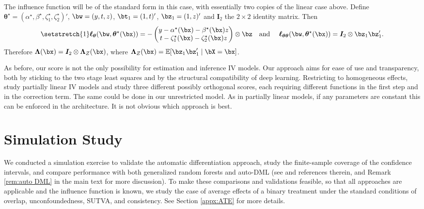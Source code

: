 \documentclass[12pt]{article}
\numberwithin{equation}{section}
\theoremstyle{definition}
\newcommand{\E}{\mathbb{E}}
\newcommand{\btheta}{\boldsymbol{\theta}}
\newcommand{\bL}{\boldsymbol{\Lambda}}
\newcommand{\bttrue}{\btheta^\star}
\newcommand{\atrue}{\alpha^\star}
\newcommand{\btrue}{\beta^\star}
\newcommand{\ztrue}{\zeta^\star}
\begin{document}
\begin{appendices}
The influence function will be of the standard form in this case, with essentially two copies of the linear case above. Define $\bttrue = (\atrue, \btrue, \ztrue_1, \ztrue_2)'$, $\bw = (y,t,z)$, $\bt_1 = (1,t)'$, $\bz_1 = (1,z)'$ and $\bm{I}_2$ the $2\times2$ identity matrix. Then
\begin{equation*}
    \setstretch{1}
    \bm{\ell}_{\btheta}(\bw, \bttrue(\bx)) = 
        - \begin{pmatrix}
            y - \atrue(\bx) - \btrue(\bx)z           \\
            t - \ztrue_1(\bx) - \ztrue_2(\bx)z  
	    \end{pmatrix} \otimes \bz
    \quad \text {and } \quad 
    \bm{\ell}_{\btheta\btheta}(\bw, \bttrue(\bx)) = \bm{I}_2 \otimes \bz_1\bz_1' .
\end{equation*}
Therefore $\bL(\bx) = \bm{I}_2 \otimes \bL_Z(\bx)$, where $\bL_Z(\bx) = \E[\bz_1\bz_1' \mid \bX = \bx]$. 

As before, our score is not the only possibility for estimation and inference IV models. Our approach aims for ease of use and transparency, both by sticking to the two stage least squares and by the structural compatibility of deep learning. Restricting to homogeneous effects, \cite{Chernozhukov-etal2018_EJ} study partially linear IV models and study three different possibly orthogonal scores, each requiring different functions in the first step and in the correction term. The same could be done in our unrestricted model. As in partially linear models, if any parameters are constant this can be enforced in the architecture. It is not obvious which approach is best. 


















\section{Simulation Study}
    \label{appx:simuls}


We conducted a simulation exercise to validate the automatic differentiation approach, study the finite-sample coverage of the confidence intervals, and compare performance with both generalized random forests \citep{Athey-Tibshirani-Wager2019_AoS} and auto-DML (see \cite{Chernozhukov-etal2024_WP} and references therein, and Remark \ref{rem:auto DML} in the main text for more discussion). 
To make these comparisons and validations feasible, so that all approaches are applicable and the influence function is known, we study the case of average effects of a binary treatment under the standard conditions of overlap, unconfoundedness, SUTVA, and consistency. See Section \ref{appx:ATE} for more details. 




\end{appendices}
\end{document}
